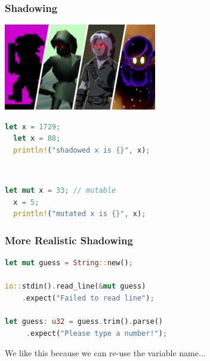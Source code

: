 \begin{frame}[fragile]
\frametitle{Shadowing}

\begin{center}
	\includegraphics[width=0.5\textwidth]{images/darklink.jpg}
\end{center}

\vspace*{-1.5em}
\begin{minipage}{.49\textwidth}
\begin{lstlisting}[language=Rust]
  let x = 1729;
  let x = 88;
  println!("shadowed x is {}", x);
\end{lstlisting}
\end{minipage}\
\begin{minipage}{.49\textwidth}
\begin{lstlisting}[language=Rust]
  let mut x = 33; // mutable
  x = 5;
  println!("mutated x is {}", x);
\end{lstlisting}
\end{minipage}

\end{frame}


\begin{frame}[fragile]
\frametitle{More Realistic Shadowing}

\begin{lstlisting}[language=Rust]
let mut guess = String::new();

io::stdin().read_line(&mut guess)
    .expect("Failed to read line");

let guess: u32 = guess.trim().parse()
     .expect("Please type a number!");
\end{lstlisting}

We like this because we can re-use the variable name...

\end{frame}


